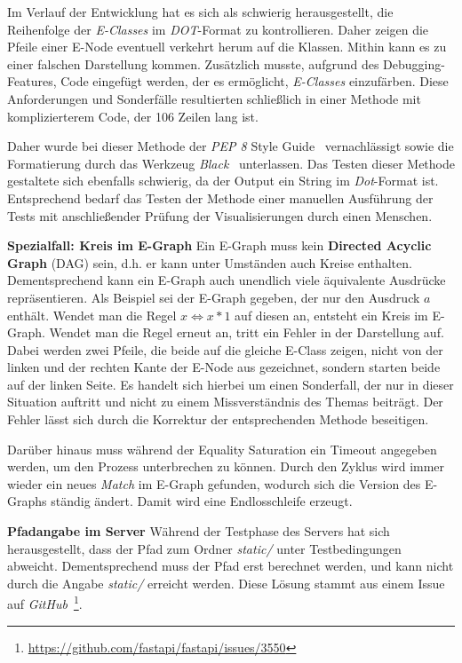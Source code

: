 Im Verlauf der Entwicklung hat es sich als schwierig herausgestellt, die Reihenfolge der \textit{E-Classes} im \textit{DOT}-Format zu kontrollieren.
Daher zeigen die Pfeile einer E-Node eventuell verkehrt herum auf die Klassen. Mithin kann es zu einer falschen Darstellung kommen.
Zusätzlich musste, aufgrund des Debugging-Features, Code eingefügt werden, der es ermöglicht, \textit{E-Classes} einzufärben.
Diese Anforderungen und Sonderfälle resultierten schließlich in einer Methode mit komplizierterem Code, der 106 Zeilen lang ist.

Daher wurde bei dieser Methode der \textit{PEP 8} Style Guide~\cite{pep} vernachlässigt sowie die Formatierung durch das Werkzeug \textit{Black}~\cite{black} unterlassen.
Das Testen dieser Methode gestaltete sich ebenfalls schwierig, da der Output ein String im \textit{Dot}-Format ist. Entsprechend bedarf das Testen der Methode
einer manuellen Ausführung der Tests mit anschließender Prüfung der Visualisierungen durch einen Menschen.

\noindent\textbf{Spezialfall: Kreis im E-Graph} Ein E-Graph muss kein \textbf{Directed Acyclic Graph} (DAG) sein, d.h. er kann unter Umständen auch Kreise enthalten. 
Dementsprechend kann ein E-Graph auch unendlich viele äquivalente Ausdrücke repräsentieren.
Als Beispiel sei der E-Graph gegeben, der nur den Ausdruck $a$ enthält. Wendet man die Regel $x \Leftrightarrow x * 1$ auf diesen an, entsteht ein Kreis im E-Graph.
Wendet man die Regel erneut an, tritt ein Fehler in der Darstellung auf. Dabei werden zwei Pfeile, die beide auf die gleiche E-Class zeigen, nicht von der linken und der rechten
Kante der E-Node aus gezeichnet, sondern starten beide auf der linken Seite. Es handelt sich hierbei um einen Sonderfall, der nur in dieser Situation auftritt und nicht zu einem 
Missverständnis des Themas beiträgt. Der Fehler lässt sich durch die Korrektur der entsprechenden Methode beseitigen.

Darüber hinaus muss während der Equality Saturation ein Timeout angegeben werden, um den Prozess unterbrechen zu können. Durch den Zyklus wird immer wieder ein neues \textit{Match}
im E-Graph gefunden, wodurch sich die Version des E-Graphs ständig ändert. Damit wird eine Endlosschleife erzeugt.

\noindent\textbf{Pfadangabe im Server} Während der Testphase des Servers hat sich herausgestellt, dass der Pfad zum Ordner \textit{static/} unter Testbedingungen abweicht.
Dementsprechend muss der Pfad erst berechnet werden, und kann nicht durch die Angabe \textit{static/} erreicht werden. Diese Lösung stammt aus einem Issue auf 
\textit{GitHub}~\footnote{\hspace{1.5mm}\url{https://github.com/fastapi/fastapi/issues/3550}}.

